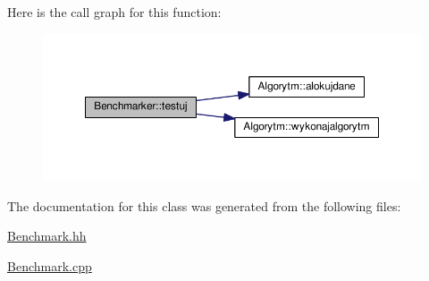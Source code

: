 Here is the call graph for this function\+:
\nopagebreak
\begin{figure}[H]
\begin{center}
\leavevmode
\includegraphics[width=350pt]{a00009_aeecfb553991fc29bbf58420d0c019c1e_cgraph}
\end{center}
\end{figure}




The documentation for this class was generated from the following files\+:\begin{DoxyCompactItemize}
\item 
\hyperlink{a00036}{Benchmark.\+hh}\item 
\hyperlink{a00035}{Benchmark.\+cpp}\end{DoxyCompactItemize}

